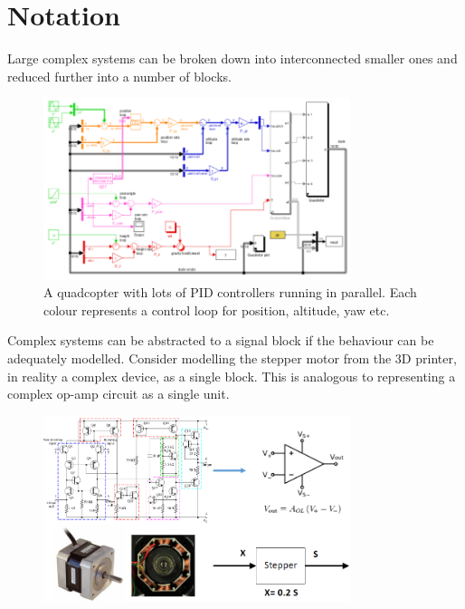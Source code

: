 \documentclass[class=report, crop=false, 12pt,a4paper]{standalone}
\begin{document}
\section{Notation}
Large complex systems can be broken down into interconnected smaller ones and reduced further into a number of blocks. 
\begin{figure}[H]
  \centering
  \includegraphics[width = 0.8\textwidth]{../img/quadcopterexampleblock.png}
  \caption{A quadcopter with lots of PID controllers running in parallel. Each colour represents a control loop for position, altitude, yaw etc.}
\end{figure}
Complex systems can be abstracted to a signal block if the behaviour can be adequately modelled. Consider modelling the stepper motor from the 3D printer, in reality a complex device, as a single block. This is analogous to representing a complex op-amp circuit as a single unit.
\begin{figure}[H]
  \centering
  \includegraphics[width = 0.8\textwidth]{../img/blockdiagram4.png}
\end{figure}
\end{document}
